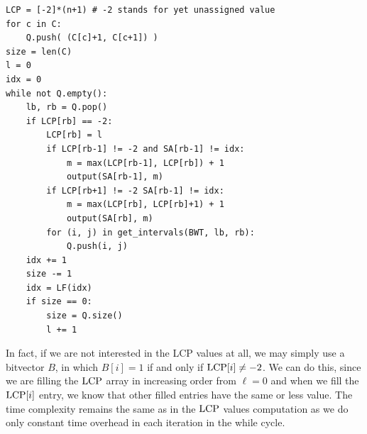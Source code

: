 \begin{verbatim}
LCP = [-2]*(n+1) # -2 stands for yet unassigned value
for c in C:
    Q.push( (C[c]+1, C[c+1]) )
size = len(C)
l = 0
idx = 0
while not Q.empty():
    lb, rb = Q.pop()
    if LCP[rb] == -2:
        LCP[rb] = l
        if LCP[rb-1] != -2 and SA[rb-1] != idx:
            m = max(LCP[rb-1], LCP[rb]) + 1
            output(SA[rb-1], m)
        if LCP[rb+1] != -2 SA[rb-1] != idx:
            m = max(LCP[rb], LCP[rb]+1) + 1
            output(SA[rb], m)
        for (i, j) in get_intervals(BWT, lb, rb):
            Q.push(i, j)
    idx += 1
    size -= 1
    idx = LF(idx)
    if size == 0:
        size = Q.size()
        l += 1
\end{verbatim}

In fact, if we are not interested in the LCP values at all, we may simply use a bitvector $B$, in which $B[i] = 1$ if and only if $\text{LCP}[i] \neq -2$.
We can do this, since we are filling the $\text{LCP}$ array in increasing order from $\ell = 0$ and when we fill the $\text{LCP}[i]$ entry, we know that other filled entries have the same or less value.
The time complexity remains the same as in the $\text{LCP}$ values computation as we do only constant time overhead in each iteration in the while cycle.